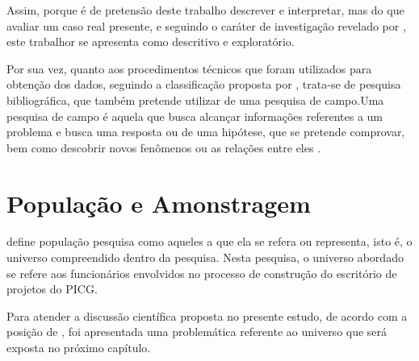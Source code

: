 Assim, porque é de pretensão deste trabalho descrever e interpretar, mas do que avaliar um caso real presente, e seguindo o caráter de investigação revelado por , este trabalhor se apresenta como descritivo e exploratório.

Por sua vez, quanto aos procedimentos técnicos que foram utilizados para obtenção dos dados, seguindo a classificação proposta por , trata-se de pesquisa bibliográfica, que também pretende utilizar de uma pesquisa de campo.Uma pesquisa de campo é aquela que busca alcançar informações referentes a um problema e busca uma resposta ou de uma hipótese, que se pretende comprovar, bem como descobrir novos fenômenos ou as relações entre eles \cite{de2007metodologia}.


\section{População e Amonstragem}

 define população pesquisa como aqueles a que ela se refera ou representa, isto é, o universo compreendido dentro da pesquisa. Nesta pesquisa, o universo abordado se refere aos funcionários envolvidos no processo de construção do escritório de projetos do PICG.

Para atender a discussão científica proposta no presente estudo, de acordo com a posição de , foi apresentada uma problemática referente ao universo que será exposta no próximo capítulo.
